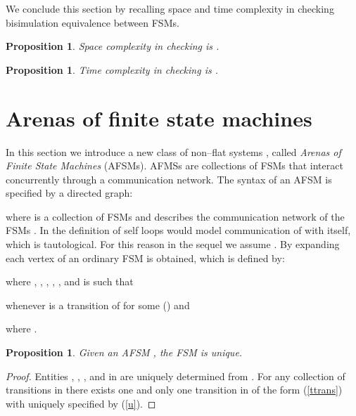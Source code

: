 \documentclass{amsart}
\newtheorem{proposition}[theorem]{Proposition}
\theoremstyle{definition}
\theoremstyle{remark}
\numberwithin{equation}{section}
\begin{document}
We conclude this section by recalling space and time complexity in checking bisimulation equivalence between FSMs. 
\begin{proposition}
\label{prop21}
\cite{BisAlg}
Space complexity in checking  is .
\end{proposition}

\begin{proposition}
\label{prop22}
\cite{BisAlg}
Time complexity in checking  is . 
\end{proposition}

\section{Arenas of finite state machines}
In this section we introduce a new class of non--flat systems \cite{HFSM1,CHSM}, called \textit{Arenas of Finite State Machines} (AFSMs). AFMSs 
are collections of FSMs that interact concurrently through a communication network. 
The syntax of an AFSM is specified by a directed graph: 

where  is a collection of  FSMs  and  describes the communication network of the FSMs . 
In the definition of  self loops  would model communication of  with itself, which is tautological. For this reason in the sequel we assume . 
By expanding each vertex  of  an ordinary FSM is obtained, which is defined by:

where , , , , , and  is such that 

whenever  is a transition of  for some  () and 

where . 

\begin{proposition}
Given an AFSM , the FSM  is unique.
\end{proposition}

\begin{proof}
Entities , , ,  and  in  are uniquely determined from . For any collection of  transitions  in  there exists one and only one transition in  of the form (\ref{ttrans}) with  uniquely specified by (\ref{u}).
\end{proof}
\end{document}
